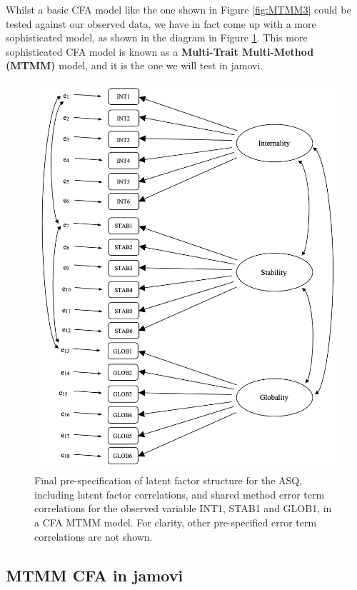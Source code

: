 \documentclass[
]{book}
\begin{document}
Whilst a basic CFA model like the one shown in Figure \ref{fig:MTMM3} could be tested against our observed data, we have in fact come up with a more sophisticated model, as shown in the diagram in Figure \ref{fig:MTMM4}. This more sophisticated CFA model is known as a {\textbf{Multi-Trait Multi-Method (MTMM)}} model, and it is the one we will test in jamovi.

\begin{figure}

{\centering \includegraphics[width=1\linewidth]{img/factoranalysis/MTMM4} 

}

\caption{Final pre-specification of latent factor structure for the ASQ, including latent factor correlations, and shared method error term correlations for the observed variable INT1, STAB1 and GLOB1, in a CFA MTMM model. For clarity, other pre-specified error term correlations are not shown.}\label{fig:MTMM4}
\end{figure}

\hypertarget{mtmm-cfa-in-jamovi}{%
\subsection{MTMM CFA in jamovi}\label{mtmm-cfa-in-jamovi}}
\end{document}
